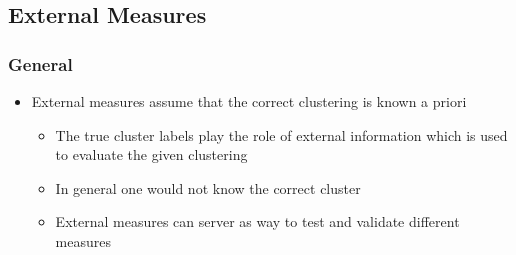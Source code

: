 \documentclass[11pt]{article}
\begin{document}
\subsection{External Measures}
\label{sec:orge4a5032}
\subsubsection{General}
\label{sec:org7a751e2}
\begin{itemize}
\item External measures assume that the correct clustering is known a priori
\begin{itemize}
\item The true cluster labels play the role of external information which is used to evaluate the given clustering
\item In general one would not know the correct cluster
\item External measures can server as way to test and validate different measures
\end{itemize}


\end{itemize}
\end{document}
